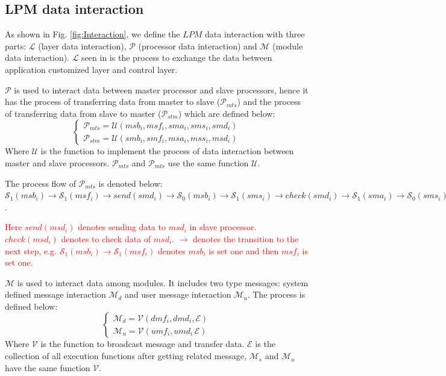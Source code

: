 \documentclass[journal,UTF8]{IEEEtran}
\begin{document}
 
 \subsection{LPM data interaction}
 As shown in Fig. \ref{fig:Interaction}, we define the $LPM$ data interaction with three parts: $\mathcal{L}$ (layer data interaction), $\mathcal{P}$ (processor data interaction) and $\mathcal{M}$ (module data interaction). $\mathcal{L}$ seen in \cite{WuA} is the process to exchange the data between application customized layer and control layer.

$\mathcal{P}$ is used to interact data between master processor and slave processors, hence it has the process of transferring data from master to slave ($\mathcal{P}_{mts}$) and the process of transferring data from slave to master ($\mathcal{P}_{stm}$) which are defined below:
 \begin{equation}
 \left\{
 \begin{array}{l}
 \mathcal{P}_{mts} = \mathcal{U} (msb_i,msf_i,sma_i,sms_i,smd_i)\\
 \mathcal{P}_{stm} = \mathcal{U} (smb_i,smf_i,msa_i,mss_i,msd_i)
 \end{array}
 \right.
 \end{equation}
Where $\mathcal{U}$ is the function to implement the process of data interaction between master and slave processors. $\mathcal{P}_{mts}$ and $\mathcal{P}_{mts}$ use the same function $\mathcal{U}$.

 The process flow of $\mathcal{P}_{mts}$ is denoted below:
 $\mathcal{S}_1(msb_i)\to\mathcal{S}_1(msf_i)\to send(smd_i)\to\mathcal{S}_0(msb_i)\to\mathcal{S}_1(sms_i)\to check(smd_i)\to\mathcal{S}_1(sma_i)\to\mathcal{S}_0(sms_i)\to\mathcal{S}_0(sma_i)\to\mathcal{S}_0(msf_i)$.
 
\textcolor{red}{Here $send(msd_i)$ denotes sending data to $msd_i$ in slave processor. $check(msd_i)$ denotes to check data of $msd_i$. $\to$ denotes the transition to the next step, e.g. $\mathcal{S}_1(msb_i)\to\mathcal{S}_1(msf_i)$ denotes $msb_i$ is set one and then $msf_i$ is set one.}
 
$\mathcal{M}$ is used to interact data among modules. It includes two type messages: system defined message interaction $\mathcal{M}_{d}$ and user message interaction $\mathcal{M}_{u}$. The process is defined below:
 \begin{equation}
\left\{
\begin{array}{l}
\mathcal{M}_{d} = \mathcal{V} (dmf_i,dmd_i,\mathcal{E})\\
\mathcal{M}_{u} = \mathcal{V} (umf_i,umd_i\,\mathcal{E})
\end{array}
\right.
\end{equation}
Where $\mathcal{V}$ is the function to broadcast message and transfer data. $\mathcal{E}$ is the collection of all execution functions after getting related message, $\mathcal{M}_{s}$ and $\mathcal{M}_{u}$ have the same function $\mathcal{V}$.
\end{document}
